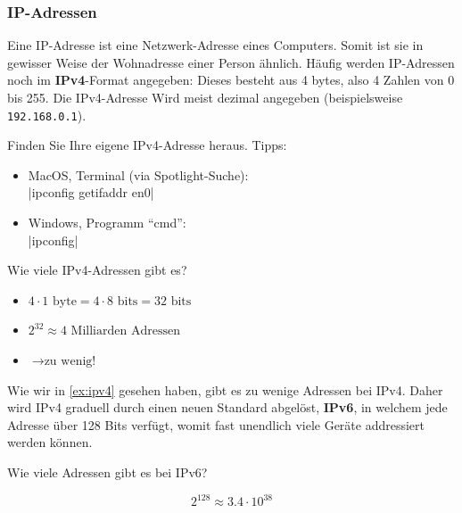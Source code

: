 \subsubsection{IP-Adressen}

Eine \acrfull{IP}-Adresse ist eine Netzwerk-Adresse eines Computers. Somit ist sie in gewisser Weise der Wohnadresse einer Person ähnlich. Häufig werden IP-Adressen noch im \textbf{IPv4}-Format angegeben: Dieses besteht aus 4 bytes, also 4 Zahlen von 0 bis 255. Die IPv4-Adresse Wird meist dezimal angegeben (beispielsweise \texttt{192.168.0.1}).
\begin{myexercise}
	Finden Sie Ihre eigene IPv4-Adresse heraus. Tipps:
	\begin{itemize}
		\item MacOS, Terminal (via Spotlight-Suche): \\
		      \commandbox|ipconfig getifaddr en0|
		\item Windows, Programm ``cmd'': \\
		      \commandbox|ipconfig|
	\end{itemize}
\end{myexercise}
\begin{myexercise}\label{ex:ipv4}
	Wie viele IPv4-Adressen gibt es?
	\begin{myanswer}
		\begin{itemize}
			\item $4\cdot 1 \text{ byte} = 4\cdot 8 \text{ bits} = 32 \text{ bits}$
			\item $2^{32} \approx 4 \text{ Milliarden Adressen}$
			\item $\rightarrow \text{zu wenig!}$
		\end{itemize}
	\end{myanswer}
\end{myexercise}
Wie wir in \cref{ex:ipv4} gesehen haben, gibt es zu wenige Adressen bei IPv4. Daher wird IPv4 graduell durch einen neuen Standard abgelöst, \textbf{IPv6}, in welchem jede Adresse über 128 Bits verfügt, womit fast unendlich viele Geräte addressiert werden können.

\begin{myexercise}
	Wie viele Adressen gibt es bei IPv6?
	\begin{myanswer}
		\[2^{128} \approx 3.4\cdot 10^{38}\]
	\end{myanswer}
\end{myexercise}


